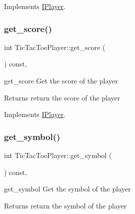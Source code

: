 Implements \hyperlink{class_i_player}{I\+Player}.

\mbox{\label{class_tic_tac_toe_player_ad0f195090b263ae0ec24019edfeb9f3d}} 
\subsubsection{\texorpdfstring{get\+\_\+score()}{get\_score()}}
{\footnotesize\ttfamily int Tic\+Tac\+Toe\+Player\+::get\+\_\+score (\begin{DoxyParamCaption}{ }\end{DoxyParamCaption}) const\hspace{0.3cm}{\ttfamily [inline]}, {\ttfamily [virtual]}}



get\+\_\+score Get the score of the player 

\begin{DoxyReturn}{Returns}
return the score of the player 
\end{DoxyReturn}


Implements \hyperlink{class_i_player}{I\+Player}.

\mbox{\label{class_tic_tac_toe_player_a5e73a7154c82e2a09f1b89e5e5d70796}} 
\subsubsection{\texorpdfstring{get\+\_\+symbol()}{get\_symbol()}}
{\footnotesize\ttfamily int Tic\+Tac\+Toe\+Player\+::get\+\_\+symbol (\begin{DoxyParamCaption}{ }\end{DoxyParamCaption}) const\hspace{0.3cm}{\ttfamily [inline]}, {\ttfamily [virtual]}}



get\+\_\+symbol Get the symbol of the player 

\begin{DoxyReturn}{Returns}
return the symbol of the player 
\end{DoxyReturn}


